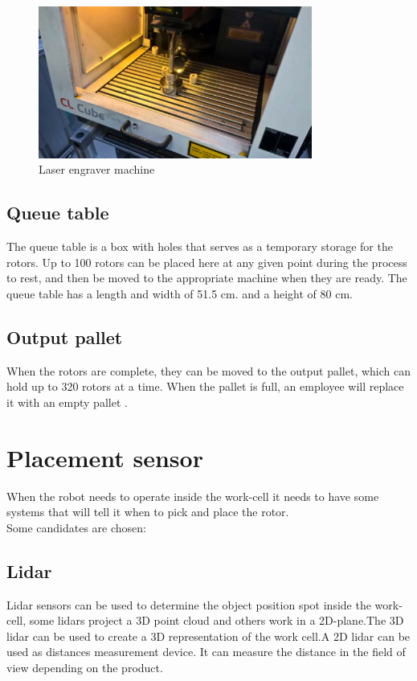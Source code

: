   \begin{figure}[h!]
    \centering
    \includegraphics[width=9cm]{InitialProblemstatement/Case/engrave.PNG}
    \caption{Laser engraver machine\cite{Case}}
    \label{fig:Laserengravermachine}
  \end{figure}
  
 \subsection{Queue table}
 The queue table is a box with holes that serves as a temporary storage for the rotors. Up to 100 rotors can be placed here at any given point during the process to rest, and then be moved to the appropriate machine when they are ready. The queue table has a length and width of 51.5 cm. and a height of 80 cm\cite{Case}.\\  
 
 \subsection{Output pallet}
 When the rotors are complete, they can be moved to the output pallet, which can hold up to 320 rotors at a time. When the pallet is full, an employee will replace it with an empty pallet \cite{Case}.\\ 
 
 \section{Placement sensor}\label{ref:PlacementS}
 
 When the robot needs to operate inside the work-cell it needs to have some systems that will tell it when to pick and place the rotor.\\
 Some candidates are chosen:\\

 
  \subsection{Lidar} 
  Lidar sensors can be used to determine the object position spot inside the work-cell, some lidars project a 3D point cloud and others work in a 2D-plane\cite{Lidar}.The 3D lidar can be used to create a 3D representation of the work cell.A 2D lidar can be used as distances measurement device. It can measure the distance in the field of view depending on the product\cite{Lidar}.\\

